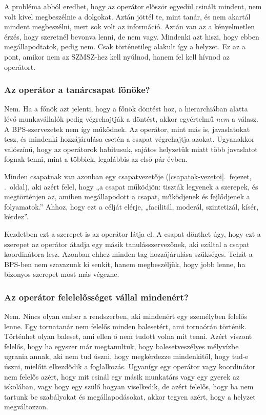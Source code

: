 A probléma abból eredhet, hogy az operátor először egyedül csinált
mindent, nem volt kivel megbeszélnie a dolgokat. Aztán jöttél te, mint
tanár, és nem akartál mindent megbeszélni, mert sok volt az információ.
Aztán van az a kényelmetlen érzés, hogy szeretnél bevonva lenni, de nem
vagy. Mindenki azt hiszi, hogy ebben megállapodtatok, pedig nem. Csak
történetileg alakult így a helyzet. Ez az a pont, amikor nem az
SZMSZ-hez kell nyúlnod, hanem fel kell hívnod az operátort.

\hypertarget{az-operator-a-tanarcsapat-fonoke}{%
\subsubsection{Az operátor a tanárcsapat
főnöke?}\label{az-operator-a-tanarcsapat-fonoke}}

Nem. Ha a főnök azt jelenti, hogy a főnök döntést hoz, a hierarchiában
alatta lévő munkavállalók pedig végrehajtják a döntést, akkor egyértelmű
\emph{nem} a válasz. A BPS-szervezetek nem így működnek. Az operátor, mint más
is, javaslatokat tesz, és mindenki hozzájárulása esetén a csapat
végrehajtja azokat. Ugyanakkor valószínű, hogy az operátorok habitusuk,
sajátos helyzetük miatt több javaslatot fognak tenni, mint a többiek, legalábbis az első pár
évben.

Minden csapatnak van azonban egy
csapatvezetője (\ref{csapatok-vezetoi}.~fejezet, .~oldal),
aki azért felel, hogy „a csapat működjön: tiszták legyenek a szerepek, és
megtörténjen az, amiben megállapodott a csapat, működjenek és
fejlődjenek a folyamatok.'' Ahhoz, hogy ezt a célját elérje, „facilitál,
moderál, szintetizál, kísér, kérdez''.

Kezdetben ezt a szerepet is az operátor látja el. A csapat dönthet úgy,
hogy ezt a szerepet az operátor átadja egy másik tanulásszervezőnek, aki
ezáltal a csapat koordinátora lesz. Azonban ehhez minden tag
hozzájárulása szükséges. Tehát a BPS-ben nem szavazunk ki senkit, hanem
megbeszéljük, hogy jobb lenne, ha bizonyos szerepet most más végezne.

\hypertarget{az-operator-felelelosseget-vallal-mindenert}{%
\subsubsection{Az operátor felelelősséget vállal
mindenért?}\label{az-operator-felelelosseget-vallal-mindenert}}

Nem. Nincs olyan ember a rendszerben, aki mindenért egy személyben\break
felelős lenne. Egy tornatanár nem felelős minden balesetért, ami
tornaórán történik. Történhet olyan baleset, ami ellen ő nem tudott
volna mit tenni. Azért viszont felelős, hogy ha egyszer már megtanultuk,
hogy balesetveszélyes mélyvízbe ugrania annak, aki nem tud úszni, hogy
megkérdezze mindenkitől, hogy tud-e úszni, mielőtt elkezdődik a
foglalkozás. Ugyanígy egy operátor vagy koordinátor nem felelős azért, hogy
mit csinál egy másik munkatárs vagy egy gyerek az iskolában, vagy hogy
egy szülő hogyan viselkedik, de azért felelős, hogy ha nem tartunk be
szabályokat és megállapodásokat, akkor tegyen azért, hogy a helyzet
megváltozzon.

